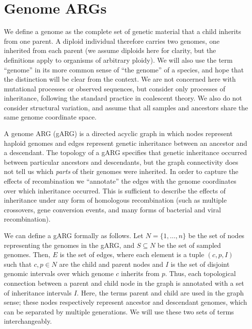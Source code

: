 \documentclass{article}
\begin{document}
\section{Genome ARGs}
\label{sec-gARG}
We define a genome as the complete set of genetic material that a child
inherits from one parent. A diploid individual
therefore carries two genomes, one inherited from each parent (we assume diploids here
for clarity, but the definitions apply to organisms of arbitrary ploidy).
We will also use the term ``genome'' in its
more common sense of ``the genome'' of a species,
and hope that the distinction will be clear from the context.
We are not concerned here with mutational processes or observed sequences,
but consider only processes of inheritance,
following the standard practice in coalescent theory.
We also do not consider structural variation, and assume that all
samples and ancestors share the same genome coordinate space.

A genome ARG (gARG) is a directed acyclic graph in which nodes represent
haploid genomes and edges represent
genetic inheritance between an ancestor and a descendant.
The topology of a gARG specifies that genetic inheritance
occurred between particular
ancestors and descendants, but the graph connectivity
does not tell us which \emph{parts} of their genomes were inherited.
In order to capture the effects of recombination
 we ``annotate'' the edges with the genome
coordinates over which inheritance occurred.
This is sufficient to describe the effects of inheritance under
any form of homologous recombination (such as multiple crossovers,
gene conversion events, and many forms of bacterial and viral recombination).

We can define a gARG formally as follows.
Let $N = \{1, \dots, n\}$ be the set of nodes representing
the genomes in the gARG,
and  $S \subseteq N$ be the set of sampled genomes.
Then, $E$ is the set of edges, where each element
is a tuple $(c, p, I)$ such that $c, p \in N$ are the child and
parent nodes and $I$ is the set of disjoint genomic intervals
over which genome $c$ inherits from $p$.
Thus, each topological connection between
a parent and child node in the graph is annotated with a set of
inheritance intervals $I$.
Here, the terms parent and child are used in the graph sense;
these nodes respectively represent ancestor and descendant genomes,
which can be separated by multiple generations.
We will use these two sets of terms interchangeably.
\end{document}

